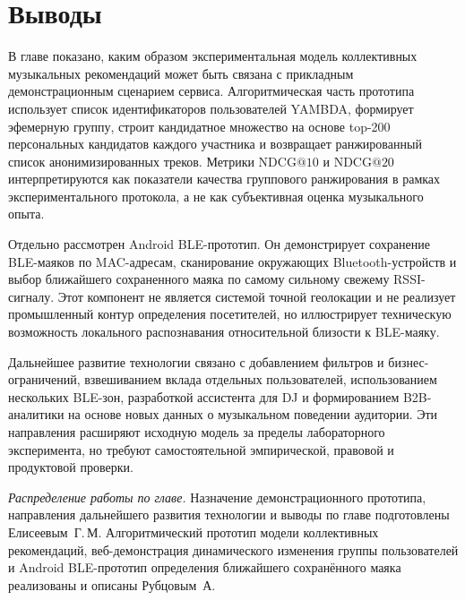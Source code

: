 \section{Выводы}
\label{sec:ch6:conclusions}

В главе показано, каким образом экспериментальная модель коллективных музыкальных рекомендаций может быть связана с прикладным демонстрационным сценарием сервиса. Алгоритмическая часть прототипа использует список идентификаторов пользователей YAMBDA, формирует эфемерную группу, строит кандидатное множество на основе top-200 персональных кандидатов каждого участника и возвращает ранжированный список анонимизированных треков. Метрики $\mathrm{NDCG@10}$ и $\mathrm{NDCG@20}$ интерпретируются как показатели качества группового ранжирования в рамках экспериментального протокола, а не как субъективная оценка музыкального опыта.

Отдельно рассмотрен Android BLE-прототип. Он демонстрирует сохранение BLE-маяков по MAC-адресам, сканирование окружающих Bluetooth-устройств и выбор ближайшего сохраненного маяка по самому сильному свежему RSSI-сигналу. Этот компонент не является системой точной геолокации и не реализует промышленный контур определения посетителей, но иллюстрирует техническую возможность локального распознавания относительной близости к BLE-маяку.

Дальнейшее развитие технологии связано с добавлением фильтров и бизнес-ограничений, взвешиванием вклада отдельных пользователей, использованием нескольких BLE-зон, разработкой ассистента для DJ и формированием B2B-аналитики на основе новых данных о музыкальном поведении аудитории. Эти направления расширяют исходную модель за пределы лабораторного эксперимента, но требуют самостоятельной эмпирической, правовой и продуктовой проверки.

\textit{Распределение работы по главе.} Назначение демонстрационного прототипа, направления дальнейшего развития технологии и выводы по главе подготовлены Елисеевым~Г.\,М. Алгоритмический прототип модели коллективных рекомендаций, веб-демонстрация динамического изменения группы пользователей и Android BLE-прототип определения ближайшего сохранённого маяка реализованы и описаны Рубцовым~А.
